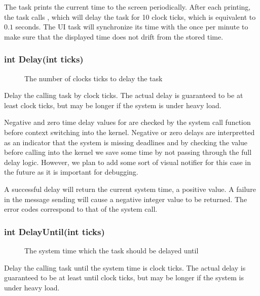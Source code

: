 \documentclass[pdftex,10pt,a4paper]{article}
\begin{document}
The  task prints the current time to the screen
periodically. After each printing, the task calls ,
which will delay the task for 10 clock ticks, which is equivalent to
$0.1$ seconds. The UI task will synchronize its time with the
 once per minute to make sure that the displayed
time does not drift from the stored time.


\subsubsection*{int Delay(int ticks)}

\begin{description}
\item[] The number of clocks ticks to delay the task
\end{description}

Delay the calling task by  clock ticks. The actual delay is
guaranteed to be at least  clock ticks, but may be longer
if the system is under heavy load.

Negative and zero time delay values for  are checked by the
system call function before context switching into the
kernel. Negative or zero delays are interpretted as an indicator that
the system is missing deadlines and by checking the value before
calling into the kernel we save some time by not passing through the
full delay logic. However, we plan to add some sort of visual notifier
for this case in the future as it is important for debugging.

A successful delay will return the current system time, a positive
value. A failure in the message sending will cause a negative integer
value to be returned. The error codes correspond to that of the
 system call.


\subsubsection*{int DelayUntil(int ticks)}

\begin{description}
\item[] The system time which the task should be delayed
  until
\end{description}

Delay the calling task until the system time is  clock
ticks. The actual delay is guaranteed to be at least until 
clock ticks, but may be longer if the system is under heavy load.
\end{document}
